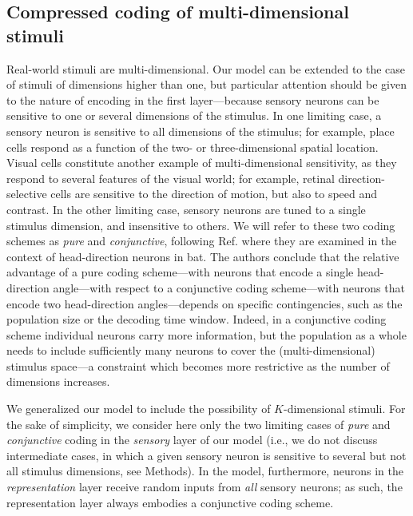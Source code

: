\documentclass[a4paper]{article}%
\begin{document}
\subsection*{Compressed coding of multi-dimensional stimuli}

Real-world stimuli are multi-dimensional. Our model can be extended to the
case of stimuli of dimensions higher than one, but particular attention should
be given to the nature of encoding in the first layer---because sensory
neurons can be sensitive to one or several dimensions of the stimulus. In one
limiting case, a sensory neuron is sensitive to all dimensions of the
stimulus; for example, place cells respond as a function of the two- or
three-dimensional spatial location. Visual cells constitute another example of
multi-dimensional sensitivity, as they respond to several features of the
visual world; for example, retinal direction-selective cells are sensitive to
the direction of motion, but also to speed and contrast. In the other limiting
case, sensory neurons are tuned to a single stimulus dimension, and
insensitive to others. We will refer to these two coding schemes as
\textit{pure} and \textit{conjunctive}, following Ref.
\cite{Finkelstein2018OptimalBats} where they are examined in the context of
head-direction neurons in bat. The authors conclude that the relative
advantage of a pure coding scheme---with neurons that encode a single
head-direction angle---with respect to a conjunctive coding scheme---with
neurons that encode two head-direction angles---depends on specific
contingencies, such as the population size or the decoding time window.
Indeed, in a conjunctive coding scheme individual neurons carry more
information, but the population as a whole needs to include sufficiently many
neurons to cover the (multi-dimensional) stimulus space---a constraint which
becomes more restrictive as the number of dimensions increases.

We generalized our model to include the possibility of $K$-dimensional
stimuli. For the sake of simplicity, we consider here only the two limiting
cases of \textit{pure} and \textit{conjunctive} coding in the \textit{sensory}
layer of our model (i.e., we do not discuss intermediate cases, in which a
given sensory neuron is sensitive to several but not all stimulus dimensions,
see Methods). In the model, furthermore, neurons in the
\textit{representation} layer receive random inputs from \textit{all} sensory
neurons; as such, the representation layer always embodies a conjunctive
coding scheme.
\end{document}
